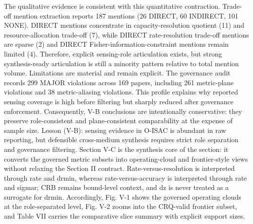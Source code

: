 {}The qualitative evidence is consistent with this quantitative contraction. Trade-off mention extraction reports 187 mentions (26 DIRECT, 60 INDIRECT, 101 NONE). DIRECT mentions concentrate in capacity-resolution quotient (11) and resource-allocation trade-off (7), while DIRECT rate-resolution trade-off mentions are sparse (2) and DIRECT Fisher-information-constraint mentions remain limited (4). Therefore, explicit sensing-role articulation exists, but strong synthesis-ready articulation is still a minority pattern relative to total mention volume.\markdownRendererParagraphSeparator
{}Limitations are material and remain explicit. The governance audit records 299 MAJOR violations across 169 papers, including 261 metric-plane violations and 38 metric-aliasing violations. This profile explains why reported sensing coverage is high before filtering but sharply reduced after governance enforcement. Consequently, V-B conclusions are intentionally conservative: they preserve role-consistent and plane-consistent comparability at the expense of sample size.\markdownRendererParagraphSeparator
{}Lesson (V-B): sensing evidence in O-ISAC is abundant in raw reporting, but defensible cross-medium synthesis requires strict role separation and governance filtering.\markdownRendererInterblockSeparator
{}
\markdownRendererSectionEnd \markdownRendererSectionBegin
{}\markdownRendererInterblockSeparator
{}Section V-C is the synthesis core of the section: it converts the governed metric subsets into operating-cloud and frontier-style views without relaxing the Section II contract. Rate-versus-resolution is interpreted through rate and drmin, whereas rate-versus-accuracy is interpreted through rate and sigma\markdownRendererUnderscore{}r; CRB remains bound-level context, and dz is never treated as a surrogate for drmin. Accordingly, Fig. V-1 shows the governed operating clouds at the role-separated level, Fig. V-2 zooms into the CRQ-valid frontier subset, and Table VII carries the comparative slice summary with explicit support sizes.\markdownRendererParagraphSeparator
{}\markdownRendererParagraphSeparator
